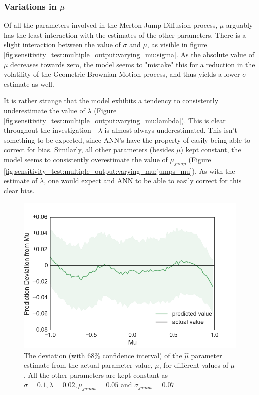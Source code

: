 \documentclass[11pt,oneside,openany,a4paper,english, report, goldenblock
]{usthesis}
\begin{document}
\subsubsection{Variations in $\mu$}
Of all the parameters involved in the Merton Jump Diffusion process, $\mu$ arguably has the least interaction with the estimates of the other parameters. There is a slight interaction between the value of $\sigma$ and $\mu$, as visible in figure \ref{fig:sensitivity_test:multiple_output:varying_mu:sigma}. As the absolute value of $\mu$ decreases towards zero, the model seems to "mistake" this for a reduction in the volatility of the Geometric Brownian Motion process, and thus yields a lower $\sigma$ estimate as well.

It is rather strange that the model exhibits a tendency to consistently underestimate the value of $\lambda$ (Figure \ref{fig:sensitivity_test:multiple_output:varying_mu:lambda}). This is clear throughout the investigation - $\lambda$ is almost always underestimated. This isn't something to be expected, since ANN's have the property of easily being able to correct for bias.
Similarly, all other parameters (besides $\mu$) kept constant, the model seems to consistently overestimate the value of $\mu_{jump}$ (Figure \ref{fig:sensitivity_test:multiple_output:varying_mu:jumps_mu}). As with the estimate of $\lambda$, one would expect and ANN to be able to easily correct for this clear bias.

\begin{figure}[h]
	\centering
	\includegraphics[width=0.7\linewidth]{Images/Output-Sensitivity-Results/ConvolutionalNN-MultipleOutput-ELU/Varying-Mu/Mu}
	\caption{The deviation (with $68\%$ confidence interval) of the $\hat{\mu}$ parameter estimate from the actual parameter value, $\mu$, for different values of $\mu$. All the other parameters are kept constant as $\sigma = 0.1, \lambda = 0.02, \mu_{jumps} = 0.05$ and $\sigma_{jumps} = 0.07$}
	\label{fig:sensitivity_test:multiple_output:varying_mu:mu}
\end{figure}
\end{document}

